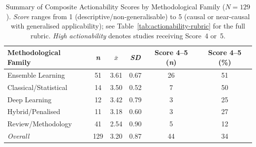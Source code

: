 \begin{table}[H]
\centering
\small
\caption{Summary of Composite Actionability Scores by Methodological Family ($N = 129$).
  \emph{Score} ranges from 1 (descriptive/non-generalisable) to 5 (causal or near-causal
  with generalised applicability); see Table~\ref{tab:actionability-rubric} for the full
  rubric. \emph{High actionability} denotes studies receiving Score~4 or~5.}
\label{tab:actionability-summary}
\begin{tabular}{@{}lS[table-format=2.0]S[table-format=1.2]S[table-format=1.2]S[table-format=2.0]S[table-format=2.0]@{}}
\toprule
\textbf{Methodological Family}
  & {\textbf{\textit{n}}}
  & {$\bar{x}$}
  & {\textit{SD}}
  & {\textbf{Score 4--5 (\textit{n})}}
  & {\textbf{Score 4--5 (\%)}} \\
\midrule
Ensemble Learning          & 51 & 3.61 & 0.67 & 26 & 51 \\
Classical/Statistical      & 14 & 3.50 & 0.52 &  7 & 50 \\
Deep Learning              & 12 & 3.42 & 0.79 &  3 & 25 \\
Hybrid/Penalised           & 11 & 3.18 & 0.60 &  3 & 27 \\
Review/Methodology         & 41 & 2.54 & 0.90 &  5 & 12 \\
\midrule
\textit{Overall}           & 129 & 3.20 & 0.87 & 44 & 34 \\
\bottomrule
\end{tabular}
\end{table}
